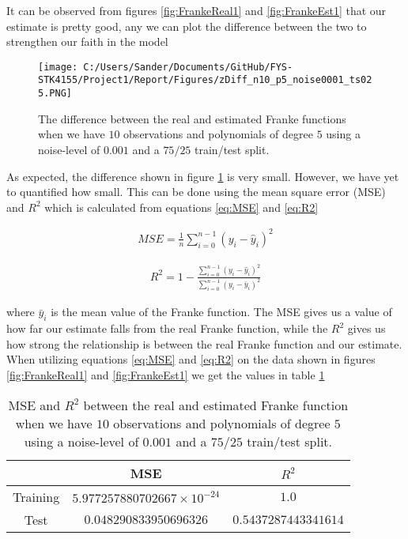 \documentclass[12pt,a4paper]{article}
\begin{document}
\noindent It can be observed from figures \ref{fig:FrankeReal1} and \ref{fig:FrankeEst1} that our estimate is pretty good, any we can plot the difference between the two to strengthen our faith in the model

\begin{figure}[H]
\centering
\texttt{[image: C:/Users/Sander/Documents/GitHub/FYS-STK4155/Project1/Report/Figures/zDiff\_n10\_p5\_noise0001\_ts025.PNG]}
\caption{\label{fig:FrankeDIFF1} The difference between the real and estimated Franke functions when we have $10$ observations and polynomials of degree $5$ using a noise-level of $0.001$ and a $75/25$ train/test split.}
\end{figure}

\noindent As expected, the difference shown in figure \ref{fig:FrankeDIFF1} is very small. However, we have yet to quantified how small. This can be done using the mean square error (MSE) and $R^2$ which is calculated from equations \ref{eq:MSE} and \ref{eq:R2}

\begin{equation}\label{eq:MSE}
\begin{aligned}
MSE = \frac{1}{n} \sum_{i=0}^{n-1}(y_i-\hat{y}_i)^2
\end{aligned}
\end{equation}

\begin{equation}\label{eq:R2}
\begin{aligned}
R^2 = 1- \frac{\sum_{i=0}^{n-1}(y_i-\hat{y}_i)^2}{\sum_{i=0}^{n-1}(y_i-\bar{y}_i)^2}
\end{aligned}
\end{equation}

\noindent where $\bar{y}_i$ is the mean value of the Franke function. The MSE gives us a value of how far our estimate falls from the real Franke function, while the $R^2$ gives us how strong the relationship is between the real Franke function and our estimate. When utilizing equations \ref{eq:MSE} and \ref{eq:R2} on the data shown in figures \ref{fig:FrankeReal1} and \ref{fig:FrankeEst1} we get the values in table \ref{tab:ESTREAL1}

\begin{table}[h]
\caption{\label{tab:ESTREAL1} MSE and $R^2$ between the real and estimated Franke function when we have $10$ observations and polynomials of degree $5$ using a noise-level of $0.001$ and a $75/25$ train/test split.}
\centering
\begin{tabular}{c|c|c}
 & MSE & $R^2$\\
\hline
Training & $5.977257880702667 \times 10^{-24}$ & $1.0$\\
\hline
Test & $0.048290833950696326$ & $0.5437287443341614$\\	  
\end{tabular}
\end{table}
\end{document}
